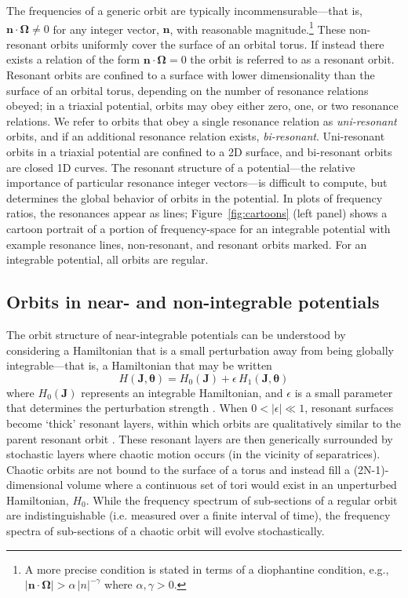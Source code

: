\documentclass[letterpaper,12pt,preprint]{aastex}
\newcommand{\bs}[1]{\boldsymbol{#1}}
\newcommand{\chchchanges}[1]{{\color{red} {#1}}}
\begin{document}
The frequencies of a generic orbit are typically incommensurable---that is, $\bs{n} \cdot \bs{\Omega} \neq 0$ for any integer vector, $\bs{n}$, with reasonable magnitude.\footnote{A more precise condition is stated in terms of a diophantine condition, e.g., $|\bs{n} \cdot \boldsymbol{\Omega}| > \alpha \, |n|^{-\gamma}$ where $\alpha, \gamma>0$.} These \chchchanges{non-resonant} orbits uniformly cover the surface of an orbital torus. If instead there exists a relation of the form $\boldsymbol{n} \cdot \boldsymbol{\Omega} = 0$ the orbit is referred to as a resonant orbit. Resonant orbits are confined to a surface with lower dimensionality than the surface of an orbital torus, depending on the number of resonance relations obeyed; in a triaxial potential, orbits may obey either zero, one, or two resonance relations. We refer to orbits that obey a single resonance relation as \emph{uni-resonant} orbits, and if an additional resonance relation exists, \emph{bi-resonant}. Uni-resonant orbits in a triaxial potential are confined to a 2D surface, and bi-resonant orbits are closed 1D curves. The resonant structure of a potential---the relative importance of particular resonance integer vectors---is difficult to compute, but determines the global behavior of orbits in the potential. In plots of frequency ratios, the resonances appear as lines; Figure~\ref{fig:cartoons} (left panel) shows a cartoon portrait of a portion of frequency-space for an integrable potential with example resonance lines, non-resonant, and resonant orbits marked. For an integrable potential, all orbits are regular.

\subsection{Orbits in near- and non-integrable potentials}

The orbit structure of near-integrable potentials can be understood by considering a Hamiltonian that is a small perturbation away from being globally integrable---that is, a Hamiltonian that may be written
\begin{equation}
	H(\boldsymbol{J}, \boldsymbol{\theta}) = H_0(\boldsymbol{J}) + \epsilon \, H_1(\boldsymbol{J}, \boldsymbol{\theta})
\end{equation}
where $H_0(\bs{J})$ represents an integrable Hamiltonian, and $\epsilon$ is a small parameter that determines the perturbation strength \citep[a description of perturbation theory applied to nonlinear Hamiltonians is given in][]{lichtenberg83}. When $0 < |\epsilon| \ll 1$, resonant surfaces become `thick' resonant layers, within which orbits are qualitatively similar to the parent resonant orbit \citep[e.g.,][]{merritt99}. These resonant layers are then generically surrounded by stochastic layers where chaotic motion occurs (in the vicinity of separatrices). \chchchanges{Chaotic orbits are not bound to the surface of a torus and instead fill a (2N-1)-dimensional volume where a continuous set of tori would exist in an unperturbed Hamiltonian, $H_0$. While the frequency spectrum of sub-sections of a regular orbit are indistinguishable (i.e. measured over a finite interval of time), the frequency spectra of sub-sections of a chaotic orbit will evolve stochastically.}
\end{document}
